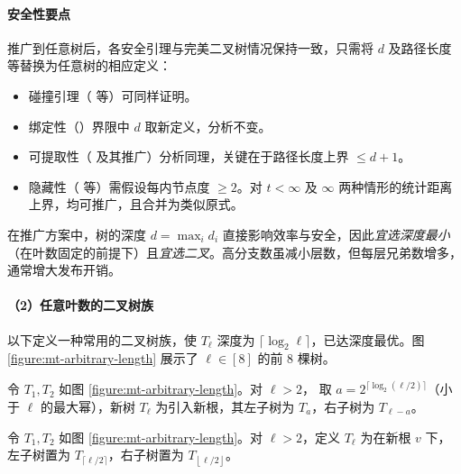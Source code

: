 \documentclass[american,singlepageview]{snargs-book-zh}
\newcommand{\floor}[1]{\left\lfloor{#1}\right\rfloor}
\newcommand{\ceil}[1]{\lceil{#1}\rceil}
\newcommand{\ROQueryBound}{t}
\newcommand{\CMMessageLength}{\ell}
\newcommand{\MTGraph}{T}
\newcommand{\MTGraphVertex}{v}
\newcommand{\MTDepth}{d}
\newcommand{\MTMessageLength}{\CMMessageLength}
\newcommand{\MTMessageIndex}{i}
\begin{document}
\paragraph{安全性要点}
推广到任意树后，各安全引理与完美二叉树情况保持一致，只需将 $\MTDepth$ 及路径长度等替换为任意树的相应定义：
\begin{itemize}[nolistsep]
  \item 碰撞引理（ 等）可同样证明。
  \item 绑定性（）界限中 $\MTDepth$ 取新定义，分析不变。
  \item 可提取性（ 及其推广）分析同理，关键在于路径长度上界 $\le\MTDepth+1$。
  \item 隐藏性（ 等）需假设每内节点度 $\ge2$。对 $\ROQueryBound<\infty$ 及 $\infty$ 两种情形的统计距离上界，均可推广，且合并为类似原式。
\end{itemize}

在推广方案中，树的深度 $\MTDepth=\max_{\MTMessageIndex}\MTDepth_{\MTMessageIndex}$ 直接影响效率与安全，因此\emph{宜选深度最小}（在叶数固定的前提下）且\emph{宜选二叉}。高分支数虽减小层数，但每层兄弟数增多，通常增大发布开销。

\medskip
\paragraph{（2）任意叶数的二叉树族}
以下定义一种常用的二叉树族，使 $\MTGraph_{\MTMessageLength}$ 深度为 $\ceil{\log_2\MTMessageLength}$，已达深度最优。图 \ref{figure:mt-arbitrary-length} 展示了 $\MTMessageLength\in[8]$ 的前 $8$ 棵树。

\begin{definition}
\label{definition:binary-tree-arbitrary-number-of-leaves}
令 $\MTGraph_1,\MTGraph_2$ 如图 \ref{figure:mt-arbitrary-length}。对 $\MTMessageLength>2$，
取 $a=2^{\ceil{\log_2(\MTMessageLength/2)}}$（小于 $\MTMessageLength$ 的最大幂），新树 $\MTGraph_{\MTMessageLength}$ 为引入新根，其左子树为 $\MTGraph_a$，右子树为 $\MTGraph_{\MTMessageLength-a}$。
\end{definition}

\begin{definition}
\label{definition:binary-tree-arbitrary-number-of-leaves-alt-1}
令 $\MTGraph_{1},\MTGraph_{2}$ 如图 \ref{figure:mt-arbitrary-length}。对 $\MTMessageLength>2$，定义 $\MTGraph_{\MTMessageLength}$ 为在新根 $\MTGraphVertex$ 下，左子树置为 $\MTGraph_{\ceil{\MTMessageLength/2}}$，右子树置为 $\MTGraph_{\floor{\MTMessageLength/2}}$。
\end{definition}
\end{document}

